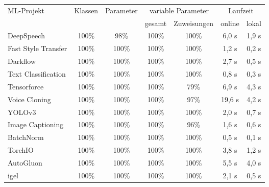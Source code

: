 \documentclass[german,bachelor]{swsLeipzig}
\begin{document}
\begin{table}[H]
\small
\begin{center}
\setlength{\tabcolsep}{5pt}
\begin{tabular}[h]{l|c|c|c|c|c|c} %
\hline
\multirow{2}{*}{ML-Projekt} & \multirow{2}{*}{Klassen}   & \multirow{2}{*}{Parameter} &   \multicolumn{2}{c|}{variable Parameter} & \multicolumn{2}{c}{Laufzeit}\\
                            &           &           &   gesamt   &   Zuweisungen & online & lokal \\
\hline \hline
DeepSpeech                          & 100\%                     & 98\%                         & 100\%             & 100\% & 6,0 s & 1,9 s\\
Fast Style Transfer                 & 100\%                     & 100\%                         & 100\%             & 100\% & 1,2 s & 0,2 s\\
Darkflow                            & 100\%                     & 100\%                         & 100\%              & 100\% & 2,7 s & 0,5 s\\
Text Classification                 & 100\%                     & 100\%                        & 100\%              & 100\% & 0,8 s & 0,3 s\\
Tensorforce                         & 100\%                    & 100\%                         & 100\%             & 79\% & 6,9 s & 4,3 s\\
\hline
Voice Cloning                      & 100\%                    & 100\%                        & 100\%            & 97\% & 19,6 s & 4,2 s\\
YOLOv3                              & 100\%                    & 100\%                        & 100\%             & 100\% & 2,0 s & 0,7 s\\
Image Captioning                    & 100\%                    & 100\%                        & 100\%             & 96\% & 1,6 s & 0,6 s\\
BatchNorm                           & 100\%                     & 100\%                        & 100\%              & 100\% & 0,5 s & 0,1 s\\
TorchIO                             & 100\%                     & 100\%                       & 100\%             & 100\% & 3,8 s & 1,2 s\\
\hline
AutoGluon                           & 100\%                     & 100\%                       & 100\%            & 100\% & 5,5 s & 4,0 s\\
igel                              & 100\%                      & 100\%                        & 100\%             & 100\% & 2,1 s & 0,5 s\\

\end{tabular}
\end{center}
\end{table}
\end{document}
